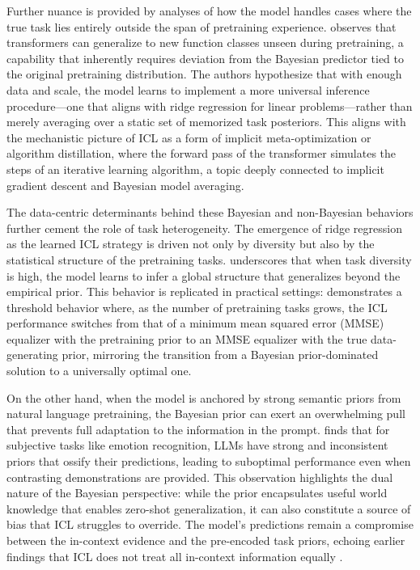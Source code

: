 \documentclass[11pt]{article}
\begin{document}
Further nuance is provided by analyses of how the model handles cases where the true task lies entirely outside the span of pretraining experience. \cite{ref47} observes that transformers can generalize to new function classes unseen during pretraining, a capability that inherently requires deviation from the Bayesian predictor tied to the original pretraining distribution. The authors hypothesize that with enough data and scale, the model learns to implement a more universal inference procedure---one that aligns with ridge regression for linear problems---rather than merely averaging over a static set of memorized task posteriors. This aligns with the mechanistic picture of ICL as a form of implicit meta-optimization or algorithm distillation, where the forward pass of the transformer simulates the steps of an iterative learning algorithm, a topic deeply connected to implicit gradient descent and Bayesian model averaging.

The data-centric determinants behind these Bayesian and non-Bayesian behaviors further cement the role of task heterogeneity. The emergence of ridge regression as the learned ICL strategy is driven not only by diversity but also by the statistical structure of the pretraining tasks. \cite{ref48} underscores that when task diversity is high, the model learns to infer a global structure that generalizes beyond the empirical prior. This behavior is replicated in practical settings: \cite{ref50} demonstrates a threshold behavior where, as the number of pretraining tasks grows, the ICL performance switches from that of a minimum mean squared error (MMSE) equalizer with the pretraining prior to an MMSE equalizer with the true data-generating prior, mirroring the transition from a Bayesian prior-dominated solution to a universally optimal one.

On the other hand, when the model is anchored by strong semantic priors from natural language pretraining, the Bayesian prior can exert an overwhelming pull that prevents full adaptation to the information in the prompt. \cite{ref29} finds that for subjective tasks like emotion recognition, LLMs have strong and inconsistent priors that ossify their predictions, leading to suboptimal performance even when contrasting demonstrations are provided. This observation highlights the dual nature of the Bayesian perspective: while the prior encapsulates useful world knowledge that enables zero-shot generalization, it can also constitute a source of bias that ICL struggles to override. The model's predictions remain a compromise between the in-context evidence and the pre-encoded task priors, echoing earlier findings that ICL does not treat all in-context information equally \cite{ref51}.
\end{document}
